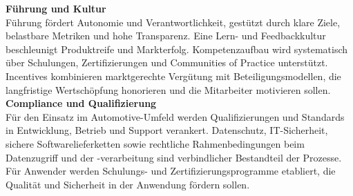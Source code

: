 \textbf{Führung und Kultur}\\
Führung fördert Autonomie und Verantwortlichkeit, gestützt durch klare Ziele, belastbare Metriken und hohe Transparenz. Eine Lern- und Feedbackkultur beschleunigt Produktreife und Markterfolg. Kompetenzaufbau wird systematisch über Schulungen, Zertifizierungen und Communities of Practice unterstützt. Incentives kombinieren marktgerechte Vergütung mit Beteiligungsmodellen, die langfristige Wertschöpfung honorieren und die Mitarbeiter motivieren sollen. \\

\textbf{Compliance und Qualifizierung}\\
Für den Einsatz im Automotive-Umfeld werden Qualifizierungen und Standards in Entwicklung, Betrieb und Support verankert. Datenschutz, IT-Sicherheit, sichere Softwarelieferketten sowie rechtliche Rahmenbedingungen beim Datenzugriff und der -verarbeitung sind verbindlicher Bestandteil der Prozesse. Für Anwender werden Schulungs- und Zertifizierungsprogramme etabliert, die Qualität und Sicherheit in der Anwendung fördern sollen.